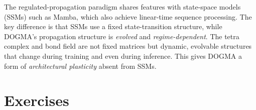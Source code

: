 \begin{implnote}
The regulated-propagation paradigm shares features with state-space models (SSMs) such as Mamba, which also achieve linear-time sequence processing. The key difference is that SSMs use a fixed state-transition structure, while DOGMA's propagation structure is \emph{evolved} and \emph{regime-dependent}. The tetra complex and bond field are not fixed matrices but dynamic, evolvable structures that change during training and even during inference. This gives DOGMA a form of \emph{architectural plasticity} absent from SSMs.
\end{implnote}

\section{Exercises}
\label{sec:ch9-exercises}

